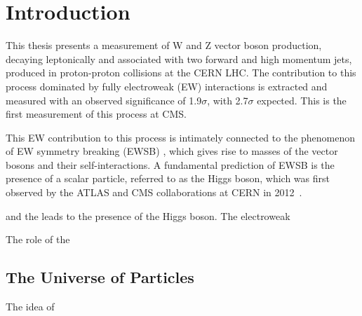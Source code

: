 \chapter{Introduction}

This thesis presents a measurement of W and Z vector boson production, 
decaying leptonically and associated
with two forward and high momentum jets, produced in proton-proton collisions
at the CERN LHC. The contribution to this process dominated by fully electroweak (EW)
interactions is extracted and measured with an observed significance of
1.9$\sigma$, with 2.7$\sigma$ expected. This is the first measurement
of this process at CMS. 

This EW contribution to this process is intimately connected to the 
phenomenon of EW symmetry breaking (EWSB) \cite{WZinclusive13TeV}, which gives rise to masses of
the vector bosons and their self-interactions. A fundamental prediction
of EWSB is the presence of a scalar particle, referred 
to as the Higgs boson, which was first observed by the ATLAS and CMS collaborations
at CERN in 2012~\cite{}. 



and the leads to the presence 
of the Higgs boson. The electroweak 

The role of the 

\section{The Universe of Particles}

The idea of 



